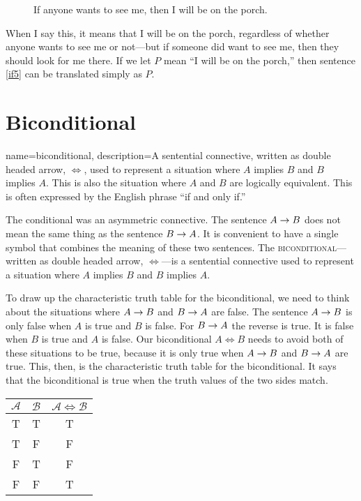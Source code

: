 \begin{description}
\item[] If anyone wants to see me, then I will be on the porch.
\end{description}

When I say this, it means that I will be on the porch, regardless of whether anyone wants to see me or not---but if someone did want to see me, then they should look for me there. If we let $P$ mean ``I will be on the porch,'' then sentence \ref{if5} can be translated simply as $P$.


\section{Biconditional}

{
name=biconditional,
description={A sentential connective, written as double headed arrow, $\iff$, used to represent a situation where $A$ implies  $B$ and $B$ implies $A$. This is also the situation where $A$ and $B$ are logically equivalent. This is often expressed by the English phrase ``if and only if.''}
}

The conditional was an asymmetric connective. The sentence $A \mathrel{\rightarrow} B$ does not mean the same thing as the sentence $B \mathrel{\rightarrow} A$. It is convenient to have a single symbol that combines the meaning of these two sentences. The \textsc{\gls{biconditional}}\label{def:bicondional}---written as double headed arrow, $\iff$---is a sentential connective used to represent a situation where $A$ implies $B$ and $B$ implies $A$.

To draw up the characteristic truth table for the biconditional, we need to think about the situations where $A \mathrel{\rightarrow} B$ and $B \mathrel{\rightarrow} A$ are false. The sentence $A \mathrel{\rightarrow} B$ is only false when $A$ is true and $B$ is false. For $B \mathrel{\rightarrow} A$ the reverse is true. It is false when $B$ is true and $A$ is false. Our biconditional $A \iff B$ needs to avoid both of these situations to be true, because it is only true when $A \mathrel{\rightarrow} B$ and $B \mathrel{\rightarrow} A$ are true. This, then, is the characteristic truth table for the biconditional. It says that the biconditional is true when the truth values of the two sides match.

\begin{center}
\begin{tabular}{c|c|c}
$\mathcal{A}$ & $\mathcal{B}$ & $\mathcal{A} \iff \mathcal{B}$\\
\hline
T & T & T\\
T & F & F\\
F & T & F\\
F & F & T
\end{tabular}
\end{center}

